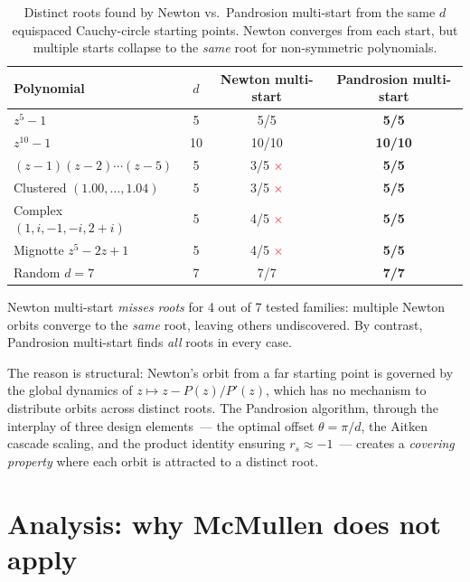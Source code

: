\documentclass[11pt,a4paper]{article}
\theoremstyle{definition}
\theoremstyle{remark}
\begin{document}
\begin{table}[h]
\centering
\caption{Distinct roots found by Newton vs.\ Pandrosion multi-start from the same $d$ equispaced Cauchy-circle starting points.  Newton converges from each start, but multiple starts collapse to the \emph{same} root for non-symmetric polynomials.}
\label{tab:multistart_comparison}
\begin{tabular}{l c cc}
\toprule
Polynomial & $d$ & Newton multi-start & Pandrosion multi-start \\
\midrule
$z^5 - 1$ & 5 & 5/5 & \textbf{5/5} \\
$z^{10} - 1$ & 10 & 10/10 & \textbf{10/10} \\
\midrule
$(z-1)(z-2)\cdots(z-5)$ & 5 & 3/5 \textcolor{red}{$\times$} & \textbf{5/5} \\
Clustered $(1.00, \ldots, 1.04)$ & 5 & 3/5 \textcolor{red}{$\times$} & \textbf{5/5} \\
Complex $(1, i, -1, -i, 2{+}i)$ & 5 & 4/5 \textcolor{red}{$\times$} & \textbf{5/5} \\
Mignotte $z^5 - 2z + 1$ & 5 & 4/5 \textcolor{red}{$\times$} & \textbf{5/5} \\
Random $d=7$ & 7 & 7/7 & \textbf{7/7} \\
\bottomrule
\end{tabular}
\end{table}

Newton multi-start \emph{misses roots} for 4 out of 7 tested families: multiple Newton orbits converge to the \emph{same} root, leaving others undiscovered.  By contrast, Pandrosion multi-start finds \emph{all} roots in every case.

The reason is structural: Newton's orbit from a far starting point is governed by the global dynamics of $z \mapsto z - P(z)/P'(z)$, which has no mechanism to distribute orbits across distinct roots.  The Pandrosion algorithm, through the interplay of three design elements~--- the optimal offset $\theta = \pi/d$, the Aitken cascade scaling, and the product identity ensuring $r_s \approx -1$~--- creates a \emph{covering property} where each orbit is attracted to a distinct root.

\section{Analysis: why McMullen does not apply}
\label{sec:analysis}
\end{document}
